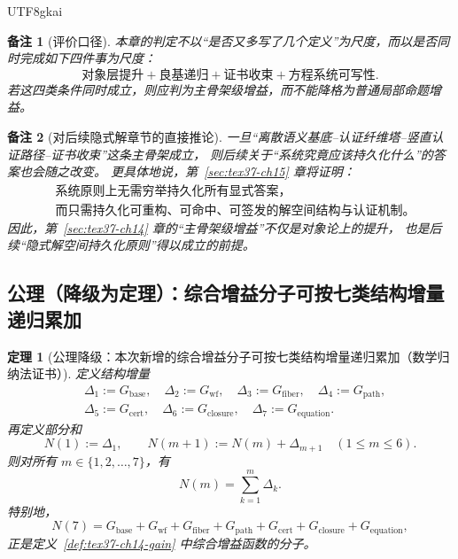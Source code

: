 \documentclass[12pt]{article}
\newtheorem{theorem}{定理}[section]
\newtheorem{remark}{备注}[section]
\begin{document}
\begin{CJK*}{UTF8}{gkai}
\begin{remark}[评价口径]
本章的判定不以“是否又多写了几个定义”为尺度，而以是否同时完成如下四件事为尺度：
\[
  \text{对象层提升}
  +
  \text{良基递归}
  +
  \text{证书收束}
  +
  \text{方程系统可写性}.
\]
若这四类条件同时成立，则应判为主骨架级增益，而不能降格为普通局部命题增益。
\end{remark}

\begin{remark}[对后续隐式解章节的直接推论]
一旦“离散语义基底--认证纤维塔--竖直认证路径--证书收束”这条主骨架成立，
则后续关于“系统究竟应该持久化什么”的答案也会随之改变。
更具体地说，第~\ref{sec:tex37-ch15} 章将证明：
\[
  \boxed{
    \begin{aligned}
      &\text{系统原则上无需穷举持久化所有显式答案，}\\
      &\text{而只需持久化可重构、可命中、可签发的解空间结构与认证机制。}
    \end{aligned}
  }
\]
因此，第~\ref{sec:tex37-ch14} 章的“主骨架级增益”不仅是对象论上的提升，
也是后续“隐式解空间持久化原则”得以成立的前提。
\end{remark}

\subsection{公理（降级为定理）：综合增益分子可按七类结构增量递归累加}
\label{subsec:tex37-ch14-axiom}

\begin{theorem}[公理降级：本次新增的综合增益分子可按七类结构增量递归累加（数学归纳法证书）]
\label{thm:tex37-ch14-decomposition}
定义结构增量
\[
  \begin{aligned}
    &\Delta_1:=G_{\mathrm{base}},\quad
    \Delta_2:=G_{\mathrm{wf}},\quad
    \Delta_3:=G_{\mathrm{fiber}},\quad
    \Delta_4:=G_{\mathrm{path}},\\
    &\Delta_5:=G_{\mathrm{cert}},\quad
    \Delta_6:=G_{\mathrm{closure}},\quad
    \Delta_7:=G_{\mathrm{equation}}.
  \end{aligned}
\]
再定义部分和
\[
  N(1):=\Delta_1,
  \qquad
  N(m+1):=N(m)+\Delta_{m+1}
  \quad (1\le m\le 6).
\]
则对所有 $m\in\{1,2,\dots,7\}$，有
\[
  N(m)=\sum_{k=1}^{m}\Delta_k.
\]
特别地，
\[
  N(7)
  =
  G_{\mathrm{base}}
  +
  G_{\mathrm{wf}}
  +
  G_{\mathrm{fiber}}
  +
  G_{\mathrm{path}}
  +
  G_{\mathrm{cert}}
  +
  G_{\mathrm{closure}}
  +
  G_{\mathrm{equation}},
\]
正是定义~\ref{def:tex37-ch14-gain} 中综合增益函数的分子。
\end{theorem}


\end{CJK*}
\end{document}
